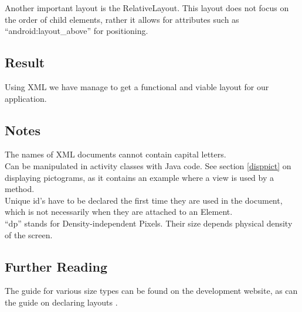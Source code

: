 Another important layout is the RelativeLayout. 
This layout does not focus on the order of child elements, rather it allows for attributes such as ``android:layout\_above'' for positioning.

\subsection*{Result}

Using XML we have manage to get a functional and viable layout for our application.

\subsection*{Notes}
The names of XML documents cannot contain capital letters.\\
Can be manipulated in activity classes with Java code.
See section \ref{disppict} on displaying pictograms, as it contains an example where a view is used by a method.\\
Unique id's have to be declared the first time they are used in the document, which is not necessarily when they are attached to an Element.\\
``dp'' stands for Density-independent Pixels. Their size depends physical density of the screen.

\subsection*{Further Reading}
The guide for various size types can be found on the development website\cite{othertypes}, as can the guide on declaring layouts \cite{declayout}.